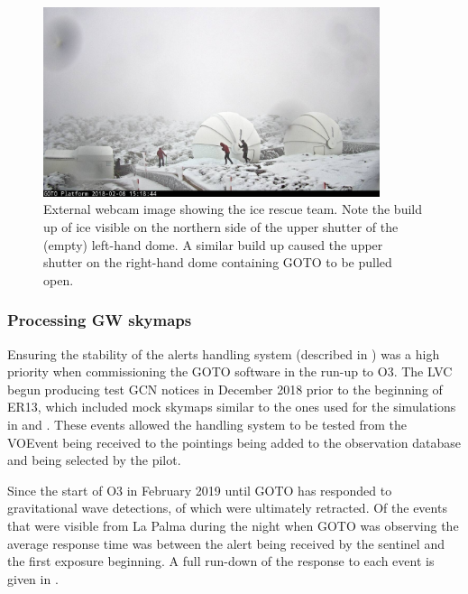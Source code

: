 \begin{colsection}
\begin{colsection}
\begin{figure}[p]
    \begin{center}
    \includegraphics[width=0.88\textwidth]{images/ice_outside.jpeg}
    \end{center}
    \caption[External webcam image showing the ice rescue team]{
        External webcam image showing the ice rescue team. Note the build up of ice visible on the northern side of the upper shutter of the (empty) left-hand dome. A similar build up caused the upper shutter on the right-hand dome containing GOTO to be pulled open.
    }\label{fig:ice_external}
\end{figure}

\clearpage

\subsubsection{Processing GW skymaps}

Ensuring the stability of the alerts handling system (described in ) was a high priority when commissioning the GOTO software in the run-up to O3. The LVC begun producing test GCN notices in December 2018 prior to the beginning of ER13, which included mock skymaps similar to the ones used for the simulations in  and . These events allowed the handling system to be tested from the VOEvent being received to the pointings being added to the observation database and being selected by the pilot.

Since the start of O3 in February 2019 until  GOTO has responded to  gravitational wave detections, of which  were ultimately retracted. Of the  events that were visible from La Palma during the night when GOTO was observing the average response time was  between the alert being received by the sentinel and the first exposure beginning. A full run-down of the response to each event is given in  .


\end{colsection}
\end{colsection}
